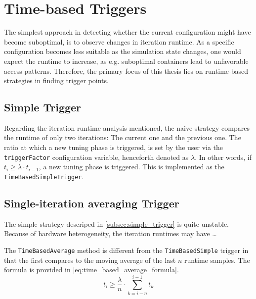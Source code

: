 
\section{Time-based Triggers}

The simplest approach in detecting whether the current configuration might have become suboptimal, is to observe changes in iteration runtime. As a specific configuration becomes less suitable as the simulation state changes, one would expect the runtime to increase, as e.g. suboptimal containers lead to unfavorable access patterns. Therefore, the primary focus of this thesis lies on runtime-based strategies in finding trigger points.

\subsection{Simple Trigger}
\label{subsec:simple_trigger}
Regarding the iteration runtime analysis mentioned, the naive strategy compares the runtime of only two iterations: The current one and the previous one. The ratio at which a new tuning phase is triggered, is set by the user via the \texttt{triggerFactor} configuration variable, henceforth denoted as $\lambda$. In other words, if $t_i \ge \lambda\cdot t_{i-1}$, a new tuning phase is triggered. This is implemented as the \texttt{TimeBasedSimpleTrigger}.


\subsection{Single-iteration averaging Trigger}
The simple strategy descriped in \autoref{subsec:simple_trigger} is quite unstable. Because of hardware heterogeneity, the iteration runtimes may have …\textellipsis %

The \texttt{TimeBasedAverage} method is different from the \texttt{TimeBasedSimple} trigger in that the first compares to the  moving average of the last $n$ runtime samples. The formula is provided in \eqref{eq:time_based_average_formula}.
\begin{equation}
	t_i \ge \frac{\lambda}{n}\cdot \sum_{k=i-n}^{i-1}t_{k}\label{eq:time_based_average_formula}
\end{equation}


